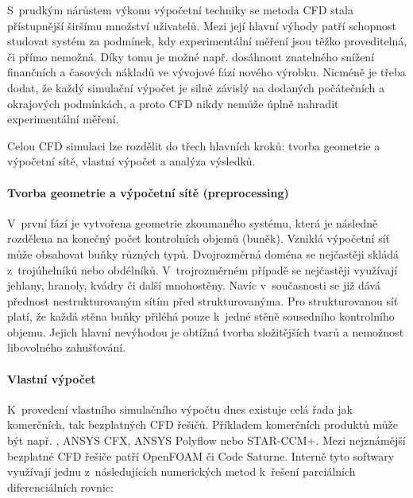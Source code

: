 S~prudkým nárůstem výkonu výpočetní techniky se metoda CFD stala přístupnější širšímu množství uživatelů. Mezi její hlavní výhody patří schopnost studovat systém za podmínek, kdy experimentální měření jsou těžko proveditelná, či přímo nemožná. Díky tomu je možné např. dosáhnout znatelného snížení finančních a časových nákladů ve vývojové fází nového výrobku. Nicméně je třeba dodat, že každý simulační výpočet je silně závislý na dodaných počátečních a okrajových podmínkách, a proto CFD nikdy nemůže úplně nahradit experimentální měření.

Celou CFD simulaci lze rozdělit do třech hlavních kroků: tvorba geometrie a výpočetní sítě, vlastní výpočet a analýza výsledků.

\paragraph{Tvorba geometrie a výpočetní sítě (preprocessing)}
V~první fází je vytvořena geometrie zkoumaného systému, která je následně rozdělena na konečný počet kontrolních objemů (buněk). Vzniklá výpočetní síť může obsahovat buňky různých typů. Dvojrozměrná doména se nejčastěji skládá z~trojúhelníků nebo obdélníků. V~trojrozměrném případě se nejčastěji využívají jehlany, hranoly, kvádry či další mnohostěny. Navíc v~současnosti se již dává přednost nestrukturovaným sítím před strukturovanýma. Pro strukturovanou síť platí, že každá stěna buňky přiléhá pouze k~jedné stěně sousedního kontrolního objemu. Jejich hlavní nevýhodou je obtížná tvorba složitějších tvarů a nemožnost libovolného zahušťování.

\paragraph{Vlastní výpočet}
K~provedení vlastního simulačního výpočtu dnes existuje celá řada jak komerčních, tak bezplatných CFD řešičů. Příkladem komerčních produktů může být např. \flu, ANSYS CFX,  ANSYS Polyflow nebo STAR-CCM+. Mezi nejznámější bezplatné CFD řešiče patří OpenFOAM či Code Saturne. Interně tyto softwary využívají jednu z~následujících numerických metod k~řešení parciálních diferenciálních rovnic:

